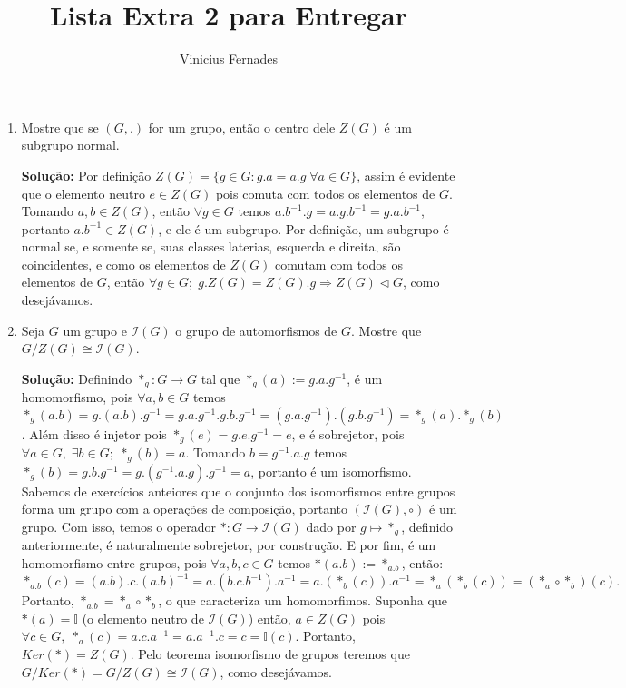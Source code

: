 \documentclass{article}
\begin{document}
	
\title{Lista Extra 2 para Entregar}
\author{Vinicius Fernades}
	
\maketitle
	
\begin{enumerate}
	\item Mostre que se $(G,.)$ for um grupo, então o centro dele $Z(G)$ é um subgrupo normal.
	
	\textbf{Solução:} Por definição $Z(G)=\{g \in G: g.a=a.g \; \forall a \in G\}$, assim é evidente que o elemento neutro $e \in Z(G)$ pois comuta com todos os elementos de $G$. Tomando $a, b \in Z(G)$, então $\forall g \in G$ temos $a.b^{-1}.g = a.g.b^{-1}= g.a.b^{-1}$, portanto $a.b^{-1} \in Z(G)$, e ele é um subgrupo. Por definição, um subgrupo é normal se, e somente se, suas classes laterias, esquerda e direita, são coincidentes, e como os elementos de $Z(G)$ comutam com todos os elementos de $G$, então $\forall g \in G; \; g.Z(G) = Z(G).g \Rightarrow Z(G) \vartriangleleft G$, como desejávamos.
	
	\item Seja $G$ um grupo e $\mathcal{I}(G)$ o grupo de automorfismos de $G$. Mostre que $G/Z(G) \cong \mathcal{I}(G)$.
	
	\textbf{Solução:} Definindo $*_{g}:G \to G$ tal que $*_{g}(a):=g.a.g^{-1}$, é um homomorfismo, pois $\forall a, b \in G$ temos $*_{g}(a.b) = g.(a.b).g^{-1} = g.a.g^{-1}.g.b.g^{-1} = (g.a.g^{-1}).(g.b.g^{-1}) = *_{g}(a). *_{g}(b)$. Além disso é injetor pois $*_{g}(e) = g.e.g^{-1} = e$, e é sobrejetor, pois $\forall a \in G, \;   \exists b\in G; \; *_{g}(b) = a$. Tomando $b= g^{-1}.a.g$ temos $*_{g}(b) = g.b.g^{-1} = g.(g^{-1}.a.g).g^{-1} =a$, portanto é um isomorfismo.
	Sabemos de exercícios anteiores que o conjunto dos isomorfismos entre grupos forma um grupo com a operações de composição, portanto $(\mathcal{I}(G), \circ)$ é um grupo. Com isso, temos o operador $*:G \to \mathcal{I}(G)$ dado por $g \mapsto *_{g}$, definido anteriormente, é naturalmente sobrejetor, por construção. E por fim, é um homomorfismo entre grupos, pois $\forall a, b, c \in G$ temos $*(a.b):= *_{a.b}$, então: 
	$$
	*_{a.b}(c) = (a.b).c.(a.b)^{-1} = a.(b.c.b^{-1}).a^{-1} = a.(*_{b}(c)).a^{-1} = *_{a}(*_{b}(c)) = (*_{a}\circ*_{b})(c).
	$$
	Portanto, $*_{a.b}=*_{a}\circ*_{b}$, o que caracteriza um homomorfimos. Suponha que $*(a) = \mathbb{I}$ (o elemento neutro de $\mathcal{I}(G)$) então, $a \in Z(G)$ pois $\forall c \in G, \; *_{a}(c) = a.c.a^{-1} = a.a^{-1}.c = c = \mathbb{I}(c)$. Portanto, $Ker(*) = Z(G)$. Pelo teorema isomorfismo de grupos teremos que $G/Ker(*) =  G/Z(G) \cong \mathcal{I}(G)$, como desejávamos.  
\end{enumerate}
		
\end{document}
